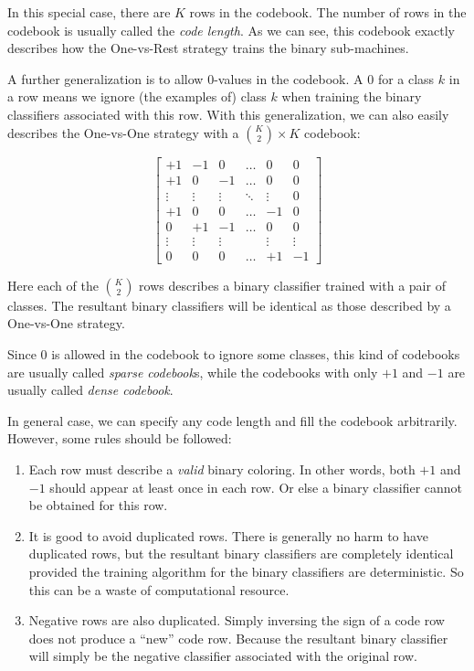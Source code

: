 In this special case, there are $K$ rows in the codebook. The number of rows in
the codebook is usually called the \emph{code length}. As we can see, this
codebook exactly describes how the One-vs-Rest strategy trains the binary
sub-machines.

A further generalization is to allow $0$-values in the codebook. A $0$ for a
class $k$ in a row means we ignore (the examples of) class $k$ when training
the binary classifiers associated with this row. With this generalization, we
can also easily describes the One-vs-One strategy with a $\binom{K}{2}\times K$
codebook:

\[
\begin{bmatrix}
+1     & -1     & 0      & \ldots & 0      & 0 \\
+1     & 0      & -1     & \ldots & 0      & 0 \\
\vdots & \vdots & \vdots & \ddots & \vdots & 0 \\
+1     & 0      & 0      & \ldots & -1     & 0 \\
0      & +1     & -1     & \ldots & 0      & 0 \\
\vdots & \vdots & \vdots &        & \vdots & \vdots \\
0      & 0      & 0      & \ldots & +1     & -1
\end{bmatrix}
\]

Here each of the $\binom{K}{2}$ rows describes a binary classifier trained with
a pair of classes. The resultant binary classifiers will be identical as those
described by a One-vs-One strategy.

Since $0$ is allowed in the codebook to ignore some classes, this kind of
codebooks are usually called \emph{sparse codebook}s, while the codebooks with
only $+1$ and $-1$ are usually called \emph{dense codebook}.

In general case, we can specify any code length and fill the codebook
arbitrarily. However, some rules should be followed:

\begin{enumerate}
    \item Each row must describe a \emph{valid} binary coloring. In other
        words, both $+1$ and $-1$ should appear at least once in each row. Or
        else a binary classifier cannot be obtained for this row.
    \item It is good to avoid duplicated rows. There is generally no harm to
        have duplicated rows, but the resultant binary classifiers are
        completely identical provided the training algorithm for the binary
        classifiers are deterministic. So this can be a waste of computational
        resource.
    \item Negative rows are also duplicated. Simply inversing the sign of a code
        row does not produce a ``new'' code row. Because the resultant binary
        classifier will simply be the negative classifier associated with the
        original row.
\end{enumerate}

